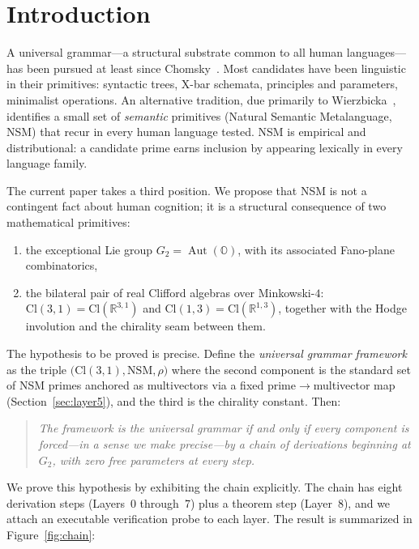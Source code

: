 \documentclass[11pt,a4paper]{article}
\theoremstyle{plain}
\theoremstyle{definition}
\theoremstyle{remark}
\numberwithin{equation}{section}
\providecommand{\Cl}{\mathrm{Cl}}
\providecommand{\OO}{\mathbb{O}}
\providecommand{\RR}{\mathbb{R}}
\DeclareMathOperator{\Aut}{Aut}
\begin{document}
\section{Introduction}\label{sec:intro}

A universal grammar---a structural substrate common to all human
languages---has been pursued at least since Chomsky~\cite{chomsky1957}.
Most candidates have been linguistic in their primitives: syntactic
trees, X-bar schemata, principles and parameters, minimalist
operations.  An alternative tradition, due primarily to
Wierzbicka~\cite{wierzbicka1996,goddard2008}, identifies a small set
of \emph{semantic} primitives (Natural Semantic Metalanguage, NSM)
that recur in every human language tested.  NSM is empirical and
distributional: a candidate prime earns inclusion by appearing
lexically in every language family.

The current paper takes a third position.  We propose that NSM is
not a contingent fact about human cognition; it is a structural
consequence of two mathematical primitives:
\begin{enumerate}[label=(\roman*)]
\item the exceptional Lie group $G_2 = \Aut(\OO)$, with its
      associated Fano-plane combinatorics,
\item the bilateral pair of real Clifford algebras over
      Minkowski-$4$:
      $\Cl(3,1) = \Cl(\RR^{3,1})$ and $\Cl(1,3) = \Cl(\RR^{1,3})$,
      together with the Hodge involution and the chirality seam
      between them.
\end{enumerate}

The hypothesis to be proved is precise.  Define the \emph{universal
grammar framework} as the triple $\bigl(\Cl(3,1), \mathrm{NSM},
\rho\bigr)$ where the second component is the standard set of
NSM primes anchored as multivectors via a fixed
prime$\to$multivector map (Section~\ref{sec:layer5}), and the
third is the chirality constant.  Then:

\begin{quote}\itshape
The framework is the universal grammar if and only if every
component is forced---in a sense we make precise---by a chain of
derivations beginning at $G_2$, with zero free parameters at every
step.
\end{quote}

We prove this hypothesis by exhibiting the chain explicitly.  The
chain has eight derivation steps (Layers~0 through~7) plus a
theorem step (Layer~8), and we attach an executable verification
probe to each layer.  The result is summarized in
Figure~\ref{fig:chain}:
\end{document}
